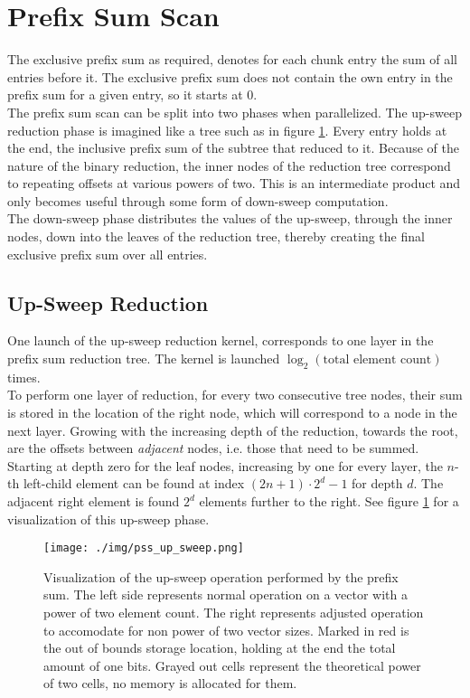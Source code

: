 \documentclass{tudscrreprt}
\begin{document}
		\section{Prefix Sum Scan}
			The exclusive prefix sum as required, denotes for each chunk entry the sum of all entries before it. The exclusive prefix sum does not contain the own entry in the prefix sum for a given entry, so it starts at 0. \\
			
			The prefix sum scan can be split into two phases when parallelized. The up-sweep reduction phase is imagined like a tree such as in figure \ref{fig:pss_up_sweep}. Every entry holds at the end, the inclusive prefix sum of the subtree that reduced to it. Because of the nature of the binary reduction, the inner nodes of the reduction tree correspond to repeating offsets at various powers of two. This is an intermediate product and only becomes useful through some form of down-sweep computation. \\
			The down-sweep phase distributes the values of the up-sweep, through the inner nodes, down into the leaves of the reduction tree, thereby creating the final exclusive prefix sum over all entries. \cite{cuda_gems3ppss} \\
		
			\subsection{Up-Sweep Reduction}
				One launch of the up-sweep reduction kernel, corresponds to one layer in the prefix sum reduction tree. The kernel is launched $\log_2(\text{total element count})$ times. \\
				To perform one layer of reduction, for every two consecutive tree nodes, their sum is stored in the location of the right node, which will correspond to a node in the next layer. Growing with the increasing depth of the reduction, towards the root, are the offsets between \emph{adjacent} nodes, i.e. those that need to be summed. Starting at depth zero for the leaf nodes, increasing by one for every layer, the $n$-th left-child element can be found at index $(2n+1) \cdot 2^d -1$ for depth $d$. The adjacent right element is found $2^d$ elements further to the right. See figure \ref{fig:pss_up_sweep} for a visualization of this up-sweep phase. \\
				\begin{figure}[!ht]
					\centering
					\texttt{[image: ./img/pss\_up\_sweep.png]}
					\caption{\label{fig:pss_up_sweep}Visualization of the up-sweep operation performed by the prefix sum. The left side represents normal operation on a vector with a power of two element count. The right represents adjusted operation to accomodate for non power of two vector sizes. Marked in red is the out of bounds storage location, holding at the end the total amount of one bits. Grayed out cells represent the theoretical power of two cells, no memory is allocated for them.}
				\end{figure}
				
\end{document}
